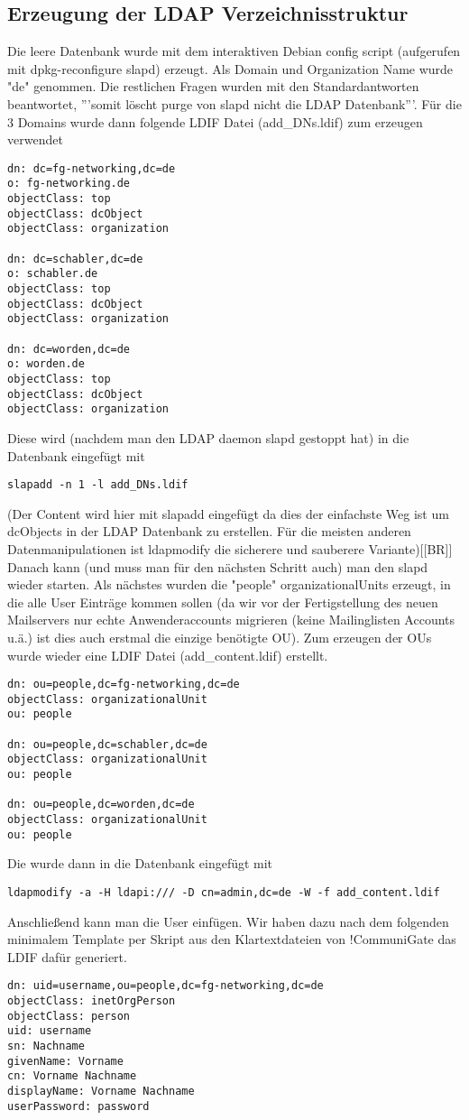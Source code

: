 \documentclass[11pt,a4paper,titlepage=firstiscover]{scrartcl} %
\begin{document}
\subsection{Erzeugung der LDAP Verzeichnisstruktur}
Die leere Datenbank wurde mit dem interaktiven Debian config script (aufgerufen mit dpkg-reconfigure slapd) erzeugt. Als Domain und Organization Name wurde "de" genommen. Die restlichen Fragen wurden mit den Standardantworten beantwortet, '''somit löscht purge von slapd nicht die LDAP Datenbank'''. Für die 3 Domains wurde dann folgende LDIF Datei (add_DNs.ldif) zum erzeugen verwendet
\begin{lstlisting}
dn: dc=fg-networking,dc=de
o: fg-networking.de
objectClass: top
objectClass: dcObject
objectClass: organization

dn: dc=schabler,dc=de
o: schabler.de
objectClass: top
objectClass: dcObject
objectClass: organization

dn: dc=worden,dc=de
o: worden.de
objectClass: top
objectClass: dcObject
objectClass: organization

\end{lstlisting}
Diese wird (nachdem man den LDAP daemon slapd gestoppt hat) in die Datenbank eingefügt mit
\begin{lstlisting}
slapadd -n 1 -l add_DNs.ldif
\end{lstlisting}
(Der Content wird hier mit slapadd eingefügt da dies der einfachste Weg ist um dcObjects in der LDAP Datenbank zu erstellen. Für die meisten anderen Datenmanipulationen ist ldapmodify die sicherere und sauberere Variante)[[BR]]
Danach kann (und muss man für den nächsten Schritt auch) man den slapd wieder starten. Als nächstes wurden die "people" organizationalUnits erzeugt, in die alle User Einträge kommen sollen (da wir vor der Fertigstellung des neuen Mailservers nur echte Anwenderaccounts migrieren (keine Mailinglisten Accounts u.ä.) ist dies auch erstmal die einzige benötigte OU). Zum erzeugen der OUs wurde wieder eine LDIF Datei (add_content.ldif) erstellt.
\begin{lstlisting}
dn: ou=people,dc=fg-networking,dc=de
objectClass: organizationalUnit
ou: people

dn: ou=people,dc=schabler,dc=de
objectClass: organizationalUnit
ou: people

dn: ou=people,dc=worden,dc=de
objectClass: organizationalUnit
ou: people
\end{lstlisting}
Die wurde dann in die Datenbank eingefügt mit
\begin{lstlisting}
ldapmodify -a -H ldapi:/// -D cn=admin,dc=de -W -f add_content.ldif
\end{lstlisting}
Anschließend kann man die User einfügen. Wir haben dazu nach dem folgenden minimalem Template per Skript aus den Klartextdateien von !CommuniGate das LDIF dafür generiert.
\begin{lstlisting}
dn: uid=username,ou=people,dc=fg-networking,dc=de
objectClass: inetOrgPerson
objectClass: person
uid: username
sn: Nachname
givenName: Vorname
cn: Vorname Nachname
displayName: Vorname Nachname
userPassword: password
\end{lstlisting}
\end{document}
